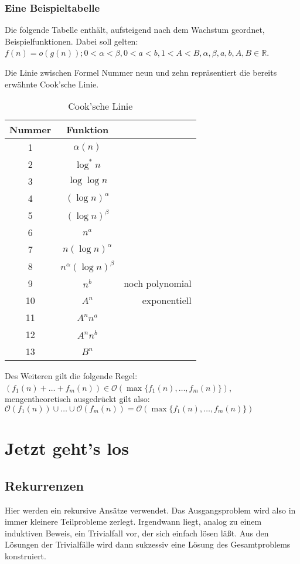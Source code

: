 \documentclass[ngerman,draft,parskip=half*,twoside]{scrreprt}
\theoremstyle{break}
\theoremstyle{nonumberbreak}
\newcommand*{\OO}{\mathcal{O}}      %
\newcommand*{\R}{\mathbb{R}}        %
\begin{document}
\subsection{Eine Beispieltabelle}
Die folgende Tabelle enthält, aufsteigend nach dem Wachstum geordnet, Beispielfunktionen.
Dabei soll gelten: $f(n)=o(g(n));0 < \alpha < \beta,0<a<b,1<A<B,
\alpha,\beta,a, b, A, B \in \R$.

Die Linie zwischen Formel Nummer neun und zehn repräsentiert die bereits erwähnte Cook'sche Linie.


\begin{table}[h]
\begin{tabular}{c|cr}
    Nummer      &Funktion       \\ \hline
    1   &       $\alpha (n)$    \\
    2   &       $\log^{*}n$     \\
    3   &       $\log \log n $ \\
    4   &       ${(\log n)}^{\alpha}$ \\
    5   &       ${(\log n)}^{\beta}$  \\
    6   &       $n^a$           \\
    7   &       $n (\log n)^{\alpha}$      \\
    8   &       $n^{\alpha}{(\log n)}^{\beta}$  \\
    9   &       $n^b$           & noch polynomial\\ \hline
    10  &       $A^n$           & exponentiell\\
    11  &       $A^n n^a$       \\
    12  &       $A^n n^b$       \\
    13  &       $B^n$           
\end{tabular}
\caption{Cook'sche Linie}
\end{table}

Des Weiteren gilt die folgende Regel: $(f_1(n)+ \dots +f_m(n)) \in \OO
(\max\{f_1(n),\dotsc,f_m(n)\})$, mengentheoretisch ausgedrückt gilt
also: $\OO(f_1(n)) \cup \dots \cup \OO(f_m(n)) = \OO
(\max\{f_1(n),\dotsc,f_m(n)\})$


\chapter{Jetzt geht's los}

\section{Rekurrenzen}
Hier werden ein rekursive Ansätze verwendet. Das Ausgangsproblem wird also in immer kleinere Teilprobleme zerlegt.
Irgendwann liegt, analog zu einem induktiven Beweis, ein Trivialfall vor, der sich einfach lösen läßt. Aus den Lösungen der Trivialfälle
wird dann sukzessiv eine Lösung des Gesamtproblems konstruiert.
\end{document}
